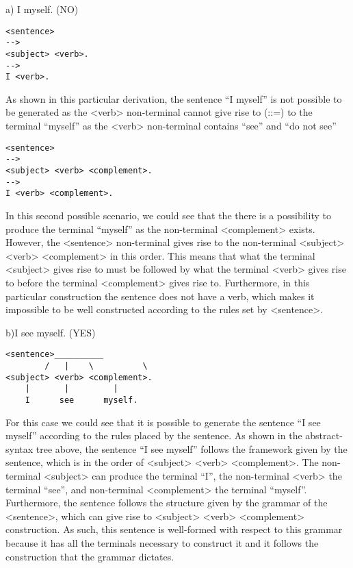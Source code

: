 \documentclass{article}
\begin{document}
\begin{alphabetize} 
\item a) I myself. (NO) 
\begin{lstlisting}
<sentence> 
-->  
<subject> <verb>. 
--> 
I <verb>. 
\end{lstlisting} \linebreak
As shown in this particular derivation, the sentence “I myself” is not possible to be generated as the <verb> non-terminal cannot give rise to (::=) to the terminal “myself” as the <verb> non-terminal contains “see” and “do not see” \linebreak

\begin{lstlisting}
<sentence> 
-->  
<subject> <verb> <complement>.
--> 
I <verb> <complement>. 
\end{lstlisting} \linebreak
In this second possible scenario, we could see that the there is a possibility to produce the terminal “myself” as the non-terminal <complement> exists. However, the <sentence> non-terminal gives rise to the non-terminal <subject> <verb> <complement> in this order. This means that what the terminal <subject> gives rise to must be followed by what the terminal <verb> gives rise to before the terminal <complement> gives rise to. Furthermore, in this particular construction the sentence does not have a verb, which makes it impossible to be well constructed according to the rules set by <sentence>. \linebreak
\item b)I see myself. (YES)
\begin{lstlisting}
<sentence>__________
        /   |    \          \
<subject> <verb> <complement>.
    |       |         |
    I      see      myself.
\end{lstlisting} \linebreak
For this case we could see that it is possible to generate the sentence “I see myself” according to the rules placed by the sentence. As shown in the abstract-syntax tree above, the sentence “I see myself” follows the framework given by the sentence, which is in the order of <subject> <verb> <complement>. The non-terminal <subject> can produce the terminal “I”, the non-terminal <verb> the terminal “see”, and non-terminal <complement> the terminal “myself”. Furthermore, the sentence follows the structure given by the grammar of the <sentence>, which can give rise to <subject> <verb> <complement> construction. As such, this sentence is well-formed with respect to this grammar because it has all the terminals necessary to construct it and it follows the construction that the grammar dictates.\linebreak


\end{alphabetize}
\end{document}
